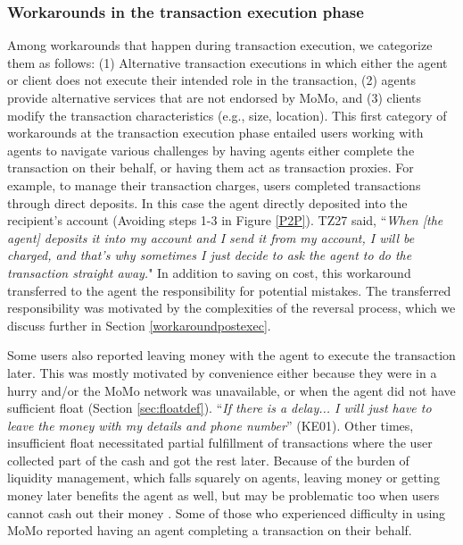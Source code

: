 \subsubsection{Workarounds in the transaction execution phase}
Among workarounds that happen during transaction execution, we categorize them as follows: (1) Alternative transaction executions in which either the agent or client does not execute their intended role in the transaction, %
(2) agents provide alternative services that are not endorsed by MoMo, and (3) clients modify the transaction characteristics (e.g., size, location).
\label{lbl:alternativeTxExec}
This first category of workarounds at the transaction execution phase entailed users working with agents to navigate various challenges by having agents either complete the transaction on their behalf, or having them act as transaction proxies. For example, to manage their transaction charges, users completed transactions through direct deposits. In this case the agent directly deposited into the recipient's account (Avoiding steps 1-3 in Figure \ref{P2P}). TZ27 said,  ``\textit{When [the agent] deposits it into my account and I send it from my account, I will be charged, and that’s why sometimes I just decide to ask the agent to do the transaction straight away.}" 
In addition to saving on cost, this workaround transferred to the agent the responsibility for potential mistakes. The transferred responsibility was motivated by the complexities of the reversal process, which we discuss further in Section \ref{workaroundpostexec}. 

Some users also reported leaving money with the agent to execute the transaction later. This was mostly motivated by convenience either because they were in a hurry and/or the MoMo network was unavailable, or when the agent did not have sufficient float (Section \ref{sec:floatdef}). ``\textit{If there is a delay... I will just have to leave the money with my details and phone number}” (KE01). Other times, insufficient float necessitated partial fulfillment of transactions where the user collected part of the cash and got the rest later. Because of the burden of liquidity management, which falls squarely on agents, \cite{eijkman2010bridges} leaving money or getting money later benefits the agent as well, but may be problematic too when users cannot cash out their money \cite{kenya2009mobile}. Some of those who experienced difficulty in using MoMo reported having an agent completing a transaction on their behalf.   


